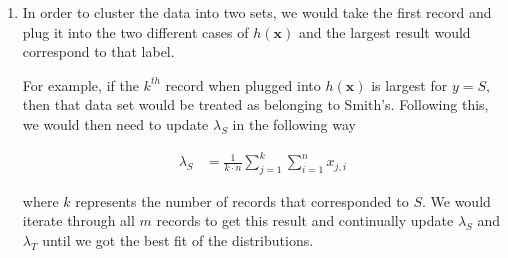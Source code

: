 \documentclass[12pt, fullpage,letterpaper]{article}
\begin{document}
\begin{enumerate}
\item In order to cluster the data into two sets, we would take the first record and plug it into the two different cases of $h(\mathbf{x})$ and the largest result would correspond to that label. 

For example, if the $k^{th}$ record when plugged into $h(\mathbf{x})$ is largest for $y=S$, then that data set would be treated as belonging to Smith's. Following this, we would then need to update $\lambda_{S}$ in the following way

\begin{align}
\lambda_{S} &= \frac{1}{k\cdot n}\sum_{j=1}^{k}\sum_{i=1}^{n}x_{j,i}
\end{align}

where $k$ represents the number of records that corresponded to $S$. We would iterate through all $m$ records to get this result and continually update $\lambda_{S}$ and $\lambda_{T}$ until we got the best fit of the distributions.


\end{enumerate}
\end{document}
